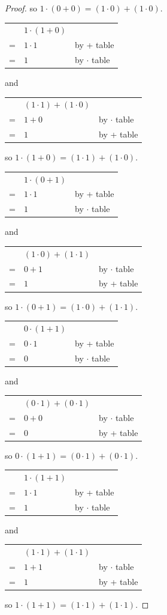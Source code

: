 \documentclass[14pt]{extarticle}
\newcommand{\cy}{\color{cyan}}
\begin{document}
\begin{proof}
so \(1 \cdot (0 + 0) = (1 \cdot 0) + (1 \cdot 0)\).

\begin{tabular}{cll}
  & \(1 \cdot (1 + 0)\) & \\
= & \(1 \cdot 1\) & {\cy by + table} \\
= & \(1\) & {\cy by $\cdot$ table}
\end{tabular}
and
\begin{tabular}{cll}
  & \((1 \cdot 1) + (1 \cdot 0)\) & \\
= & \(1 + 0\) & {\cy by $\cdot$ table} \\
= & \(1\) & {\cy by + table}
\end{tabular}

so \(1 \cdot (1 + 0) = (1 \cdot 1) + (1 \cdot 0)\).

\begin{tabular}{cll}
  & \(1 \cdot (0 + 1)\) & \\
= & \(1 \cdot 1\) & {\cy by + table} \\
= & \(1\) & {\cy by $\cdot$ table}
\end{tabular}
and
\begin{tabular}{cll}
  & \((1 \cdot 0) + (1 \cdot 1)\) & \\
= & \(0 + 1\) & {\cy by $\cdot$ table} \\
= & \(1\) & {\cy by + table}
\end{tabular}

so \(1 \cdot (0 + 1) = (1 \cdot 0) + (1 \cdot 1)\).

\begin{tabular}{cll}
  & \(0 \cdot (1 + 1)\) & \\
= & \(0 \cdot 1\) & {\cy by + table} \\
= & \(0\) & {\cy by $\cdot$ table}
\end{tabular}
and
\begin{tabular}{cll}
  & \((0 \cdot 1) + (0 \cdot 1)\) & \\
= & \(0 + 0\) & {\cy by $\cdot$ table} \\
= & \(0\) & {\cy by + table}
\end{tabular}

so \(0 \cdot (1 + 1) = (0 \cdot 1) + (0 \cdot 1)\).

\begin{tabular}{cll}
  & \(1 \cdot (1 + 1)\) & \\
= & \(1 \cdot 1\) & {\cy by + table} \\
= & \(1\) & {\cy by $\cdot$ table}
\end{tabular}
and
\begin{tabular}{cll}
  & \((1 \cdot 1) + (1 \cdot 1)\) & \\
= & \(1 + 1\) & {\cy by $\cdot$ table} \\
= & \(1\) & {\cy by + table}
\end{tabular}

so \(1 \cdot (1 + 1) = (1 \cdot 1) + (1 \cdot 1)\).
\end{proof}
\end{document}
